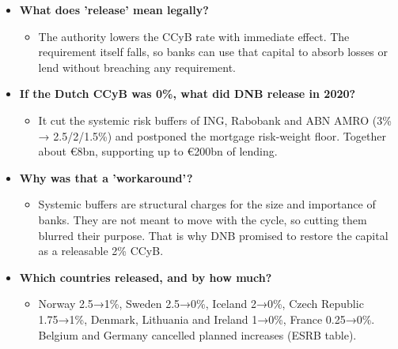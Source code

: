 \documentclass[10pt]{article}
\begin{document}
\begin{tcolorbox}[sbox,width=0.495\linewidth,height=14.6cm,nobeforeafter,box align=top,fit basedim=11pt,colframe=nlred!70,colbacktitle=nlred!8,coltitle=nlred,title=LIKELY CHALLENGES · definitions and logic]
\begin{itemize}
\item[\textcolor{navy}{\textbf{Q}}] \textbf{What does 'release' mean legally?}
\begin{itemize}
\item The authority lowers the CCyB rate with immediate effect. The requirement itself falls, so banks can use that capital to absorb losses or lend without breaching any requirement.
\end{itemize}
\item[\textcolor{navy}{\textbf{Q}}] \textbf{If the Dutch CCyB was 0\%, what did DNB release in 2020?}
\begin{itemize}
\item It cut the systemic risk buffers of ING, Rabobank and ABN AMRO (3\% → 2.5/2/1.5\%) and postponed the mortgage risk-weight floor. Together about €8bn, supporting up to €200bn of lending.
\end{itemize}
\item[\textcolor{navy}{\textbf{Q}}] \textbf{Why was that a 'workaround'?}
\begin{itemize}
\item Systemic buffers are structural charges for the size and importance of banks. They are not meant to move with the cycle, so cutting them blurred their purpose. That is why DNB promised to restore the capital as a releasable 2\% CCyB.
\end{itemize}
\item[\textcolor{navy}{\textbf{Q}}] \textbf{Which countries released, and by how much?}
\begin{itemize}
\item Norway 2.5→1\%, Sweden 2.5→0\%, Iceland 2→0\%, Czech Republic 1.75→1\%, Denmark, Lithuania and Ireland 1→0\%, France 0.25→0\%. Belgium and Germany cancelled planned increases (ESRB table).
\end{itemize}
\end{itemize}
\end{tcolorbox}
\newpage
\end{document}

